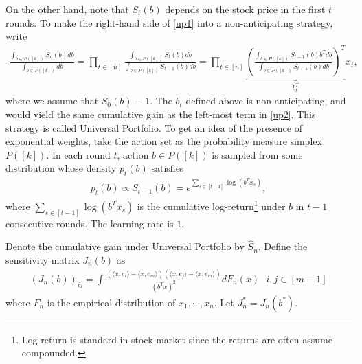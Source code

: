 \documentclass[10pt, openright]{book}
\numberwithin{equation}{section}
\theoremstyle{plain}
\theoremstyle{definition}
\begin{document}
On the other hand, note that $S_t(b)$ depends on the stock price in the first $t$ rounds. To make the right-hand side of \eqref{up1} into a non-anticipating strategy, write
\begin{align}
\frac{\int_{b\in P([k])}S_n(b)db}{\int_{b\in P([k])}db}=\prod_{t\in [n]}\frac{\int_{b\in P([k])}S_t(b)db}{\int_{b\in P([k])}S_{t-1}(b)db}=\prod_{t\in [n]}\underbrace{\left(\frac{\int_{b\in P([k])}S_{t-1}(b)b^Tdb}{\int_{b\in P([k])}S_{t-1}(b)db}\right)^T}_{b^T_t}x_t, \label{up2}
\end{align}
where we assume that $S_0(b)\equiv 1$. The $b_t$ defined above is non-anticipating, and would yield the same cumulative gain as the left-most term in \eqref{up2}. This strategy is called Universal Portfolio. To get an idea of the presence of exponential weights, take the action set as the probability measure simplex $P([k])$. In each round $t$, action $b\in P([k])$ is sampled from some distribution whose density $p_t(b)$ satisfies
\begin{align*}
p_t(b)\propto S_{t-1}(b) = e^{\sum_{s\in [t-1]}\log(b^Tx_s)},
\end{align*} 
where $\sum_{s\in [t-1]}\log(b^Tx_s)$ is the cumulative log-return\footnote{Log-return is standard in stock market since the returns are often assume compounded. } under $b$ in $t-1$ consecutive rounds. The learning rate is $1$. 

Denote the cumulative gain under Universal Portfolio by $\hat{S}_n$. 
Define the sensitivity matrix $J_n(b)$ as
\begin{align*}
(J_n(b))_{ij} = \int\frac{(\langle x, e_i\rangle-\langle x, e_m\rangle)(\langle x, e_j\rangle-\langle x, e_m\rangle)}{(b^Tx)^2}dF_n(x)\ \ \ i,j\in [m-1]
\end{align*}
where $F_n$ is the empirical distribution of $x_1, \cdots, x_n$. Let $J_n^* = J_n(b^*)$. 
\end{document}
